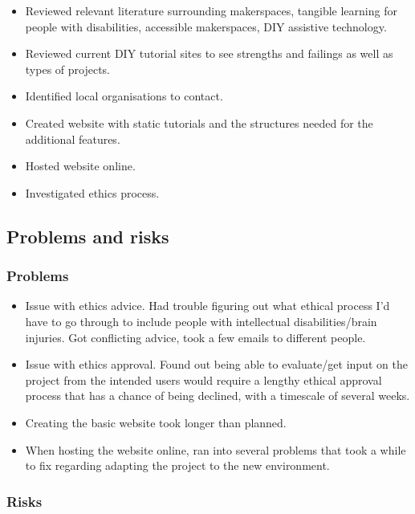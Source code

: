 \documentclass[11pt]{article}
\begin{document}
\begin{itemize}
    \item Reviewed relevant literature surrounding makerspaces, tangible learning for people with disabilities, accessible makerspaces, DIY assistive technology. 
    \item Reviewed current DIY tutorial sites to see strengths and failings as well as types of projects.
    \item Identified local organisations to contact.
    \item Created website with static tutorials and the structures needed for the additional features.
    \item Hosted website online.
    \item Investigated ethics process.
\end{itemize}

\subsection{Problems and risks}\label{problems-and-risks}

\subsubsection{Problems}\label{problems}

\begin{itemize}
    \item Issue with ethics advice. Had trouble figuring out what ethical process I'd have to go through to include people with intellectual disabilities/brain injuries. Got conflicting advice, took a few emails to different people.
    \item Issue with ethics approval. Found out being able to evaluate/get input on the project from the intended users would require a lengthy ethical approval process that has a chance of being declined, with a timescale of several weeks. 
    \item Creating the basic website took longer than planned.
    \item When hosting the website online, ran into several problems that took a while to fix regarding adapting the project to the new environment.  
\end{itemize}

\subsubsection{Risks}\label{risks}
\end{document}
